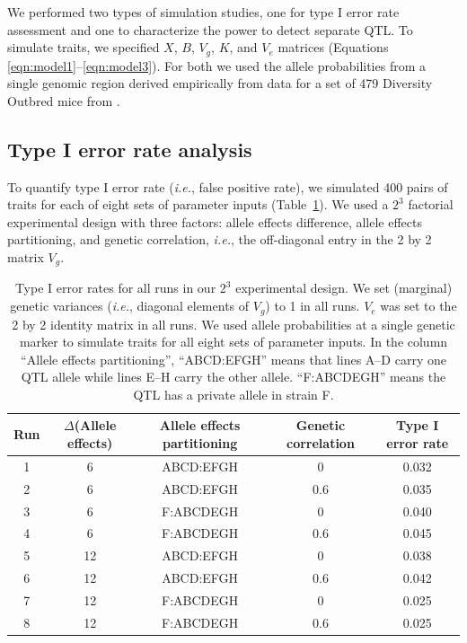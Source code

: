 \documentclass[oneside]{book}\usepackage[]{graphicx}\usepackage[]{color}
\begin{document}
We performed two types of simulation studies, one for type I error
rate assessment and one to characterize the power to detect separate
QTL. To simulate traits, we specified $X$, $B$, $V_g$, $K$, and $V_e$
matrices (Equations \ref{eqn:model1}--\ref{eqn:model3}). For both we
used the allele probabilities from a single genomic region derived
empirically from data for a set of 479 Diversity Outbred mice from
\citet{keller2018genetic}.

\subsection{Type I error rate analysis}

To quantify type I error rate ({\em i.e.}, false positive rate), we
simulated 400 pairs of traits for each of eight sets of parameter
inputs (Table~\ref{table-typeI}). We used a $2^3$ factorial
experimental design with three factors: allele effects difference,
allele effects partitioning, and genetic correlation, \textit{i.e.},
the off-diagonal entry in the 2 by 2 matrix $V_g$.

\begin{table}
\begin{center}
  \caption{Type I error rates for all runs in our $2^3$
    experimental design. We set (marginal) genetic variances
    (\emph{i.e.}, diagonal elements of $V_g$) to 1 in all runs. $V_e$
    was set to the 2 by 2 identity matrix in all runs. We used allele
    probabilities at a single genetic marker to simulate traits for
    all eight sets of parameter inputs. In the
    column ``Allele effects partitioning'', ``ABCD:EFGH'' means that lines
    A--D carry one QTL allele while lines E--H carry the other allele.
    ``F:ABCDEGH'' means the QTL has a private allele in strain F.}
  \label{table-typeI}

  \bigskip

\small
  \begin{tabular}{ c | c | c | c | c}
    \hline
    Run & $\Delta$(Allele effects) & Allele effects partitioning & Genetic correlation & Type I error rate \\ \hline
    1 & 6 & ABCD:EFGH & 0 & 0.032\\
    2 & 6 & ABCD:EFGH & 0.6 & 0.035\\
    3 & 6 & F:ABCDEGH & 0 & 0.040\\
    4 & 6 & F:ABCDEGH & 0.6 & 0.045\\
    5 & 12 & ABCD:EFGH & 0 & 0.038\\
    6 & 12 & ABCD:EFGH & 0.6 & 0.042\\
    7 & 12 & F:ABCDEGH & 0 & 0.025\\
    8 & 12 & F:ABCDEGH & 0.6 & 0.025\\
    \hline
  \end{tabular}
\end{center}
  \end{table}
\end{document}
